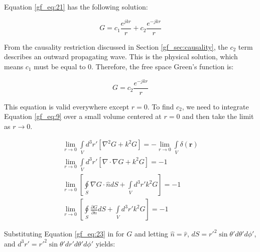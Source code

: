 Equation \ref{gf_eq:21} has the following  solution:

\begin{equation}
G = c_1\frac{e^{jkr}}{r} + c_2\frac{e^{-jkr}}{r}
\label{gf_eq:22}
\end{equation}
\renewcommand{\baselinestretch}{2} \small\normalsize

From the causality restriction discussed in Section \ref{gf_sec:causality}, the $c_2$ term describes an outward propagating wave. This is the physical solution, which means $c_1$ must be equal to $0$. Therefore, the free space Green's function is:

\begin{equation}
G = c_2\frac{e^{-jkr}}{r}
\label{gf_eq:23}
\end{equation}
\renewcommand{\baselinestretch}{2} \small\normalsize

This equation is valid everywhere except $r=0$. To find $c_2$, we need to integrate Equation \ref{gf_eq:9} over a small volume centered at $r=0$ and then take the limit as $r\rightarrow0$.

\begin{equation}
\begin{gathered}
\lim_{r\to0}\int\limits_{V}d^3r'\left[\nabla^2G+ k^2G\right] = -\lim_{r\to0}\int\limits_{V}\delta\left(\mathbf{r}\right) \\
\lim_{r\to0}\int\limits_{V}d^3r'\left[\nabla \cdot\nabla G+ k^2G\right] = -1 \\
\lim_{r\to0}\left[\oint\limits_{S}\nabla G \cdot \hat{n} dS + \int\limits_{V}d^3r' k^2G\right] = -1 \\
\lim_{r\to0}\left[\oint\limits_{S}\frac{\partial G}{\partial n} dS + \int\limits_{V}d^3r' k^2G\right] = -1
\end{gathered}
\label{gf_eq:24}
\end{equation}
\renewcommand{\baselinestretch}{2} \small\normalsize

Substituting Equation \ref{gf_eq:23} in for $G$ and letting $\hat{n} = \hat{r}$, $dS = r'^2\sin{\theta'}d\theta' d\phi'$, and  $d^3r' = r'^2\sin{\theta'}dr'd\theta' d\phi'$ yields:


